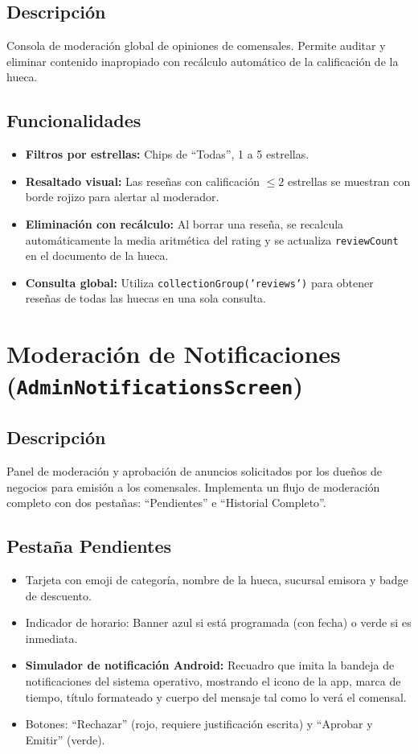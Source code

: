 \documentclass[11pt, a4paper, oneside]{report}
\begin{document}
\subsection{Descripción}
Consola de moderación global de opiniones de comensales. Permite auditar y eliminar contenido inapropiado con recálculo automático de la calificación de la hueca.

\subsection{Funcionalidades}
\begin{itemize}
  \item \textbf{Filtros por estrellas:} Chips de ``Todas'', 1 a 5 estrellas.
  \item \textbf{Resaltado visual:} Las reseñas con calificación $\leq 2$ estrellas se muestran con borde rojizo para alertar al moderador.
  \item \textbf{Eliminación con recálculo:} Al borrar una reseña, se recalcula automáticamente la media aritmética del rating y se actualiza \texttt{reviewCount} en el documento de la hueca.
  \item \textbf{Consulta global:} Utiliza \texttt{collectionGroup('reviews')} para obtener reseñas de todas las huecas en una sola consulta.
\end{itemize}

\section{Moderación de Notificaciones (\texttt{AdminNotificationsScreen})}

\subsection{Descripción}
Panel de moderación y aprobación de anuncios solicitados por los dueños de negocios para emisión a los comensales. Implementa un flujo de moderación completo con dos pestañas: ``Pendientes'' e ``Historial Completo''.

\subsection{Pestaña Pendientes}
\begin{itemize}
  \item Tarjeta con emoji de categoría, nombre de la hueca, sucursal emisora y badge de descuento.
  \item Indicador de horario: Banner azul si está programada (con fecha) o verde si es inmediata.
  \item \textbf{Simulador de notificación Android:} Recuadro que imita la bandeja de notificaciones del sistema operativo, mostrando el icono de la app, marca de tiempo, título formateado y cuerpo del mensaje tal como lo verá el comensal.
  \item Botones: ``Rechazar'' (rojo, requiere justificación escrita) y ``Aprobar y Emitir'' (verde).
\end{itemize}
\end{document}
